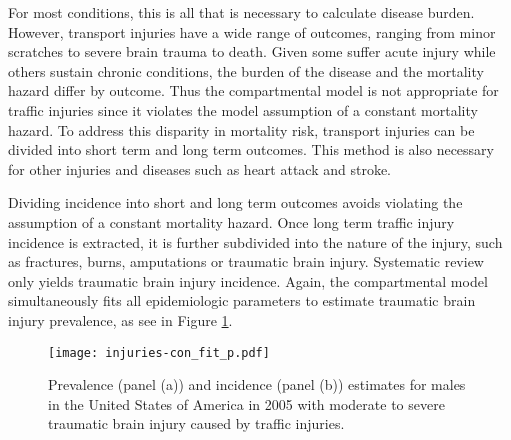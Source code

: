 For most conditions, this is all that is necessary to calculate disease burden.  However, transport injuries have a wide range of outcomes, ranging from minor scratches to severe brain trauma to death.  Given some suffer acute injury while others sustain chronic conditions, the burden of the disease and the mortality hazard differ by outcome.  Thus the compartmental model is not appropriate for traffic injuries since it violates the model assumption of a constant mortality hazard.  To address this disparity in mortality risk, transport injuries can be divided into short term and long term outcomes.  This method is also necessary for other injuries and diseases such as heart attack and stroke.
 
Dividing incidence into short and long term outcomes avoids violating the assumption of a constant mortality hazard.  Once long term traffic injury incidence is extracted, it is further subdivided into the nature of the injury, such as fractures, burns, amputations or traumatic brain injury.  Systematic review only yields traumatic brain injury incidence.  Again, the compartmental model simultaneously fits all epidemiologic parameters to estimate traumatic brain injury prevalence, as see in Figure \ref{fig:app-injury brain fit}.

    \begin{figure}[h]
        \begin{center}
            \texttt{[image: injuries-con\_fit\_p.pdf]}
            \caption{Prevalence (panel (a)) and incidence (panel (b)) estimates for males in the United States of America in 2005 with moderate to severe traumatic brain injury caused by traffic injuries.}
            \label{fig:app-injury brain fit}
        \end{center}
    \end{figure}




